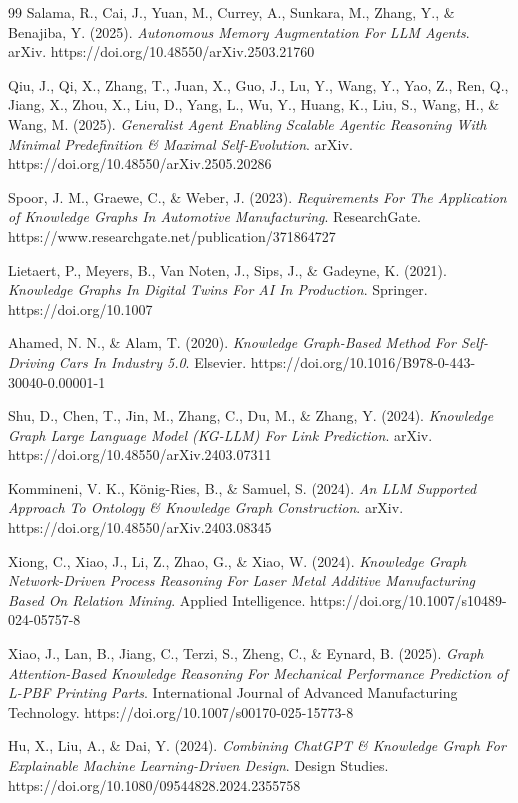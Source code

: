 \begin{thebibliography}{99}
Salama, R., Cai, J., Yuan, M., Currey, A., Sunkara, M., Zhang, Y., \& Benajiba, Y. (2025). 
\textit{Autonomous Memory Augmentation For LLM Agents}. 
arXiv. https://doi.org/10.48550/arXiv.2503.21760

\newpage
{}
Qiu, J., Qi, X., Zhang, T., Juan, X., Guo, J., Lu, Y., Wang, Y., Yao, Z., Ren, Q., Jiang, X., Zhou, X., Liu, D., Yang, L., Wu, Y., Huang, K., Liu, S., Wang, H., \& Wang, M. (2025). 
\textit{Generalist Agent Enabling Scalable Agentic Reasoning With Minimal Predefinition \& Maximal Self-Evolution}. 
arXiv. https://doi.org/10.48550/arXiv.2505.20286

Spoor, J. M., Graewe, C., \& Weber, J. (2023). 
\textit{Requirements For The Application of Knowledge Graphs In Automotive Manufacturing}. 
ResearchGate. https://www.researchgate.net/publication/371864727

Lietaert, P., Meyers, B., Van Noten, J., Sips, J., \& Gadeyne, K. (2021). 
\textit{Knowledge Graphs In Digital Twins For AI In Production}. 
Springer. https://doi.org/10.1007

Ahamed, N. N., \& Alam, T. (2020). 
\textit{Knowledge Graph-Based Method For Self-Driving Cars In Industry 5.0}. 
Elsevier. https://doi.org/10.1016/B978-0-443-30040-0.00001-1

Shu, D., Chen, T., Jin, M., Zhang, C., Du, M., \& Zhang, Y. (2024). 
\textit{Knowledge Graph Large Language Model (KG-LLM) For Link Prediction}. 
arXiv. https://doi.org/10.48550/arXiv.2403.07311

Kommineni, V. K., K{\"o}nig-Ries, B., \& Samuel, S. (2024). 
\textit{An LLM Supported Approach To Ontology \& Knowledge Graph Construction}. 
arXiv. https://doi.org/10.48550/arXiv.2403.08345

Xiong, C., Xiao, J., Li, Z., Zhao, G., \& Xiao, W. (2024). 
\textit{Knowledge Graph Network-Driven Process Reasoning For Laser Metal Additive Manufacturing Based On Relation Mining}. 
Applied Intelligence. https://doi.org/10.1007/s10489-024-05757-8

Xiao, J., Lan, B., Jiang, C., Terzi, S., Zheng, C., \& Eynard, B. (2025). 
\textit{Graph Attention-Based Knowledge Reasoning For Mechanical Performance Prediction of L-PBF Printing Parts}. 
International Journal of Advanced Manufacturing Technology. https://doi.org/10.1007/s00170-025-15773-8

Hu, X., Liu, A., \& Dai, Y. (2024). 
\textit{Combining ChatGPT \& Knowledge Graph For Explainable Machine Learning-Driven Design}. 
Design Studies. https://doi.org/10.1080/09544828.2024.2355758


\end{thebibliography}
